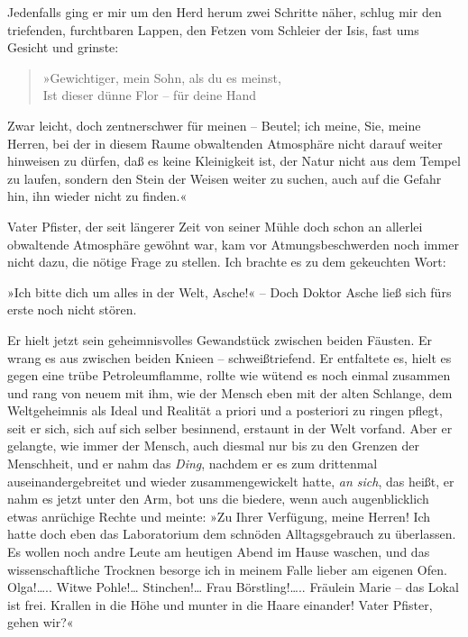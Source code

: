 Jedenfalls ging er mir um den Herd herum zwei Schritte näher,
schlug mir den triefenden, furchtbaren Lappen, den Fetzen vom
Schleier der Isis, fast ums Gesicht und grinste:

\begin{verse}
»Gewichtiger, mein Sohn, als du es meinst,\\
Ist dieser dünne Flor – für deine Hand
\end{verse}

Zwar leicht, doch zentnerschwer für meinen – Beutel; ich meine,
Sie, meine Herren, bei der in diesem Raume obwaltenden Atmosphäre
nicht darauf weiter hinweisen zu dürfen, daß es keine Kleinigkeit
ist, der Natur nicht aus dem Tempel zu laufen, sondern den Stein
der Weisen weiter zu suchen, auch auf die Gefahr hin, ihn wieder
nicht zu finden.«

Vater Pfister, der seit längerer Zeit von seiner Mühle doch schon
an allerlei obwaltende Atmosphäre gewöhnt war, kam vor
Atmungsbeschwerden noch immer nicht dazu, die nötige Frage zu
stellen. Ich brachte es zu dem gekeuchten Wort:

»Ich bitte dich um alles in der Welt, Asche!« – Doch Doktor Asche
ließ sich fürs erste noch nicht stören.

Er hielt jetzt sein geheimnisvolles Gewandstück zwischen beiden
Fäusten. Er wrang es aus zwischen beiden Knieen – schweißtriefend.
Er entfaltete es, hielt es gegen eine trübe Petroleumflamme, rollte
wie wütend es noch einmal zusammen und rang von neuem mit ihm, wie
der Mensch eben mit der alten Schlange, dem Weltgeheimnis als Ideal
und Realität a priori und a posteriori zu ringen pflegt, seit er
sich, sich auf sich selber besinnend, erstaunt in der Welt vorfand.
Aber er gelangte, wie immer der Mensch, auch diesmal nur bis zu den
Grenzen der Menschheit, und er nahm das \emph{Ding}, nachdem er es
zum drittenmal auseinandergebreitet und wieder zusammengewickelt
hatte, \emph{an sich}, das heißt, er nahm es jetzt unter den Arm,
bot uns die biedere, wenn auch augenblicklich etwas anrüchige
Rechte und meinte: »Zu Ihrer Verfügung, meine Herren! Ich hatte
doch eben das Laboratorium dem schnöden Alltagsgebrauch zu
überlassen. Es wollen noch andre Leute am heutigen Abend im Hause
waschen, und das wissenschaftliche Trocknen besorge ich in meinem
Falle lieber am eigenen Ofen. Olga!\ldots{}.. Witwe Pohle!\ldots{}
Stinchen!\ldots{} Frau Börstling!\ldots{}.. Fräulein Marie – das Lokal ist
frei. Krallen in die Höhe und munter in die Haare einander! Vater
Pfister, gehen wir?«

